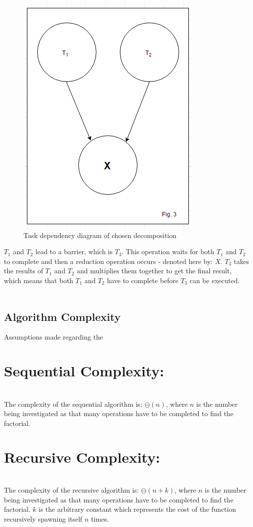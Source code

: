 \documentclass[11pt]{article}
\begin{document}
\begin{page}
\begin{figure}
\centering
     \includegraphics[scale=0.75]{parallel_fig3}\\
     Task dependency diagram of chosen decomposition
\end{figure}
\noindent $T_1$ and $T_2$ lead to a barrier, which is $T_3$. This operation waits for both $T_1$ and $T_2$ to complete and then a reduction operation occurs - denoted here by: $X$. $T_3$ takes the results of $T_1$ and $T_2$ and multiplies them together to get the final result, which means that both $T_1$ and $T_2$ have to complete before $T_3$ can be executed.\\\\


\section{Algorithm Complexity}
Assumptions made regarding the 
\noindent \chapter{Sequential Complexity:} \\
The complexity of the sequential algorithm is: $\ominus(n)$, where $n$ is the number being investigated as that many operations have to be completed to find the factorial.\\

\noindent \chapter{Recursive Complexity:} \\
The complexity of the recursive algorithm is: $\ominus(n + k)$, where $n$ is the number being investigated as that many operations have to be completed to find the factorial. $k$ is the arbitrary constant which represents the cost of the function recursively spawning itself $n$ times.\\


\end{page}
\end{document}
